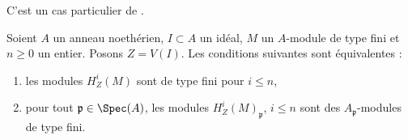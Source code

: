 \begin{lemma}
\label{lemma-check-finiteness-local-cohomology-locally}
\begin{reference}
C'est un cas particulier de \cite[Satz 1]{Faltings-finiteness}.
\end{reference}
Soient $A$ un anneau noethérien, $I \subset A$ un idéal, $M$ un $A$-module de type fini et $n \geq 0$ un entier. Posons $Z = V(I)$. Les conditions suivantes sont équivalentes :
\begin{enumerate}
\item les modules $H^i_Z(M)$ sont de type fini pour $i \leq n$,
\item pour tout $\mathfrak p \in \Spec(A)$, les modules $H^i_Z(M)_\mathfrak p$, $i \leq n$ sont des $A_\mathfrak p$-modules de type fini.
\end{enumerate}
\end{lemma}


